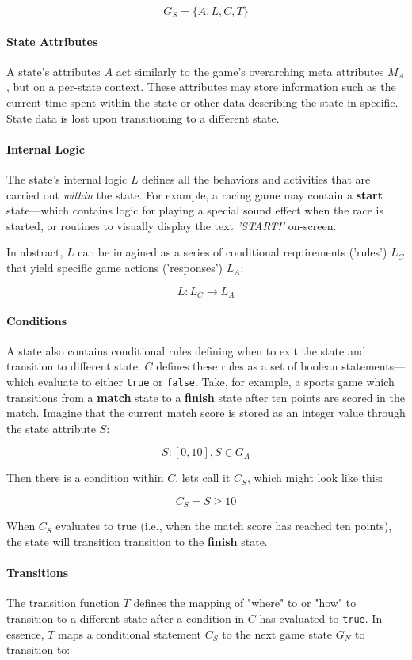 \documentclass{report}
\begin{document}
$$
G_S = \{ A, L, C, T \}
$$

\paragraph{State Attributes}
A state's attributes $A$ act similarly to the game's overarching meta attributes $M_A$, but on a per-state context. These attributes may store information such as the current time spent within the state or other data describing the state in specific. State data is lost upon transitioning to a different state.

\paragraph{Internal Logic}
The state's internal logic $L$ defines all the behaviors and activities that are carried out \textit{within} the state. For example, a racing game may contain a \textbf{start} state---which contains logic for playing a special sound effect when the race is started, or routines to visually display the text \textit{'START!'} on-screen. 

In abstract, $L$ can be imagined as a series of conditional requirements ('rules') $L_C$ that yield specific game actions ('responses') $L_A$:

$$L: L_C \longrightarrow L_A$$


\paragraph{Conditions}
A state also contains conditional rules defining when to exit the state and transition to different state. $C$ defines these rules as a set of boolean statements---which evaluate to either \texttt{true} or \texttt{false}.
Take, for example, a sports game which transitions from a \textbf{match} state to a \textbf{finish} state after ten points are scored in the match. Imagine that the current match score is stored as an integer value through the state attribute $S$: 

$$
S: [0, 10],  S \in G_A
$$

Then there is a condition within $C$, lets call it $C_S$, which might look like this:

$$
C_S = S\geq10 
$$

When $C_S$ evaluates to true (i.e., when the match score has reached ten points), the state will transition transition to the \textbf{finish} state.

\paragraph{Transitions}
The transition function $T$ defines the mapping of "where" to or "how" to transition to a different state after a condition in $C$ has evaluated to \texttt{true}. In essence, $T$ maps a conditional statement $C_S$ to the next game state $G_N$ to transition to:
\end{document}
